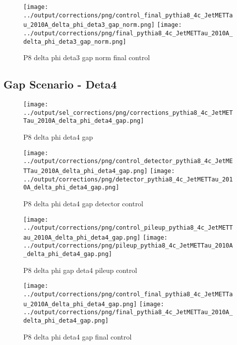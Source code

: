 \documentclass[11pt]{book}
\begin{document}
\begin{figure}[ht]
\centering
\texttt{[image: ../output/corrections/png/control\_final\_pythia8\_4c\_JetMETTau\_2010A\_delta\_phi\_deta3\_gap\_norm.png]}
\texttt{[image: ../output/corrections/png/final\_pythia8\_4c\_JetMETTau\_2010A\_delta\_phi\_deta3\_gap\_norm.png]}
\caption{P8 delta phi deta3 gap norm final control}
\label{fig:p8_JetMETTau_2010A_delta_phi_deta3_gap_norm_final_control}
\end{figure}


\clearpage
\subsection{Gap Scenario - Deta4}
\begin{figure}[ht]
\centering
\texttt{[image: ../output/sel\_corrections/png/corrections\_pythia8\_4c\_JetMETTau\_2010A\_delta\_phi\_deta4\_gap.png]}
\caption{P8 delta phi deta4 gap}
\label{fig:p8_JetMETTau_2010A_delta_phi_deta4_gap}
\end{figure}

\begin{figure}[ht]
\centering
\texttt{[image: ../output/corrections/png/control\_detector\_pythia8\_4c\_JetMETTau\_2010A\_delta\_phi\_deta4\_gap.png]}
\texttt{[image: ../output/corrections/png/detector\_pythia8\_4c\_JetMETTau\_2010A\_delta\_phi\_deta4\_gap.png]}
\caption{P8 delta phi deta4 gap detector control}
\label{fig:p8_JetMETTau_2010A_delta_phi_deta4_gap_detector_control}
\end{figure}

\begin{figure}[ht]
\centering
\texttt{[image: ../output/corrections/png/control\_pileup\_pythia8\_4c\_JetMETTau\_2010A\_delta\_phi\_deta4\_gap.png]}
\texttt{[image: ../output/corrections/png/pileup\_pythia8\_4c\_JetMETTau\_2010A\_delta\_phi\_deta4\_gap.png]}
\caption{P8 delta phi gap deta4 pileup control}
\label{fig:p8_JetMETTau_2010A_delta_phi_deta4_gap_pileup_control}
\end{figure}


\begin{figure}[ht]
\centering
\texttt{[image: ../output/corrections/png/control\_final\_pythia8\_4c\_JetMETTau\_2010A\_delta\_phi\_deta4\_gap.png]}
\texttt{[image: ../output/corrections/png/final\_pythia8\_4c\_JetMETTau\_2010A\_delta\_phi\_deta4\_gap.png]}
\caption{P8 delta phi deta4 gap final control}
\label{fig:p8_JetMETTau_2010A_delta_phi_deta4_gap_final_control}
\end{figure}
\end{document}
